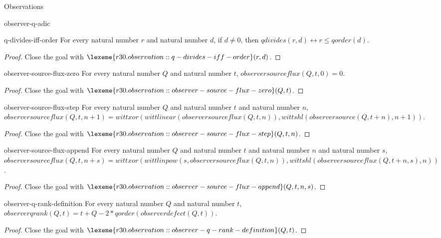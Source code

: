 \begin{lexlean}{Observations}
\begin{section}{observer-q-adic}
\begin{theorem}{q-divides-iff-order}
For every natural number \(r\) and natural number \(d\), if \(d ≠ 0\), then \(qdivides(r, d) ↔ r ≤ qorder(d)\).
\begin{proof}
Close the goal with \(\lexeme{r30.observation::q-divides-iff-order}(r, d)\).
\end{proof}
\end{theorem}

\begin{theorem}{observer-source-flux-zero}
For every natural number \(Q\) and natural number \(t\), \(observersourceflux(Q, t, 0) = 0\).
\begin{proof}
Close the goal with \(\lexeme{r30.observation::observer-source-flux-zero}(Q, t)\).
\end{proof}
\end{theorem}

\begin{theorem}{observer-source-flux-step}
For every natural number \(Q\) and natural number \(t\) and natural number \(n\), \(observersourceflux(Q, t, n + 1) = wittxor(wittlinear(observersourceflux(Q, t, n)), wittshl(observersource(Q, t + n), n + 1))\).
\begin{proof}
Close the goal with \(\lexeme{r30.observation::observer-source-flux-step}(Q, t, n)\).
\end{proof}
\end{theorem}

\begin{theorem}{observer-source-flux-append}
For every natural number \(Q\) and natural number \(t\) and natural number \(n\) and natural number \(s\), \(observersourceflux(Q, t, n + s) = wittxor(wittlinpow(s, observersourceflux(Q, t, n)), wittshl(observersourceflux(Q, t + n, s), n))\).
\begin{proof}
Close the goal with \(\lexeme{r30.observation::observer-source-flux-append}(Q, t, n, s)\).
\end{proof}
\end{theorem}

\begin{theorem}{observer-q-rank-definition}
For every natural number \(Q\) and natural number \(t\), \(observerqrank(Q, t) = t + Q - 2 * qorder(observerdefect(Q, t))\).
\begin{proof}
Close the goal with \(\lexeme{r30.observation::observer-q-rank-definition}(Q, t)\).
\end{proof}
\end{theorem}


\end{section}
\end{lexlean}
